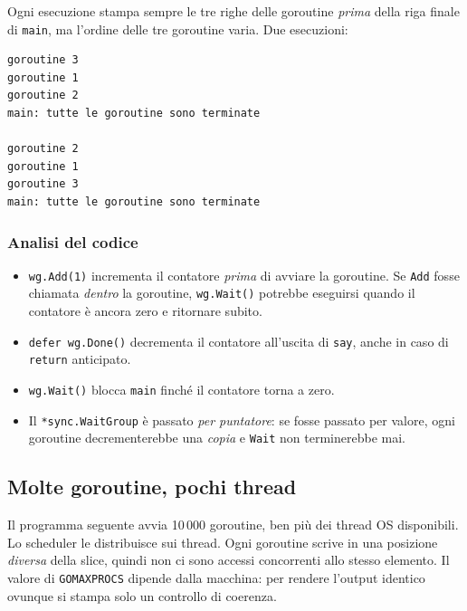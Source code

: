 \documentclass[11pt,a4paper]{report}
\newcommand{\cod}[1]{\texttt{#1}}
\begin{document}
Ogni esecuzione stampa sempre le tre righe delle goroutine \emph{prima} della
riga finale di \cod{main}, ma l'ordine delle tre goroutine varia. Due
esecuzioni:

\begin{lstlisting}[style=output]
goroutine 3
goroutine 1
goroutine 2
main: tutte le goroutine sono terminate

goroutine 2
goroutine 1
goroutine 3
main: tutte le goroutine sono terminate
\end{lstlisting}

\subsubsection*{Analisi del codice}

\begin{itemize}
  \item \cod{wg.Add(1)} incrementa il contatore \emph{prima} di avviare la
        goroutine. Se \cod{Add} fosse chiamata \emph{dentro} la goroutine,
        \cod{wg.Wait()} potrebbe eseguirsi quando il contatore è ancora zero
        e ritornare subito.
  \item \cod{defer wg.Done()} decrementa il contatore all'uscita di \cod{say},
        anche in caso di \cod{return} anticipato.
  \item \cod{wg.Wait()} blocca \cod{main} finché il contatore torna a zero.
  \item Il \cod{*sync.WaitGroup} è passato \emph{per puntatore}: se fosse
        passato per valore, ogni goroutine decrementerebbe una \emph{copia} e
        \cod{Wait} non terminerebbe mai.
\end{itemize}

\subsection{Molte goroutine, pochi thread}

Il programma seguente avvia 10\,000 goroutine, ben più dei thread OS disponibili.
Lo scheduler le distribuisce sui thread. Ogni goroutine scrive in una posizione
\emph{diversa} della slice, quindi non ci sono accessi concorrenti allo stesso
elemento. Il valore di \cod{GOMAXPROCS} dipende dalla macchina: per rendere
l'output identico ovunque si stampa solo un controllo di coerenza.
\end{document}
